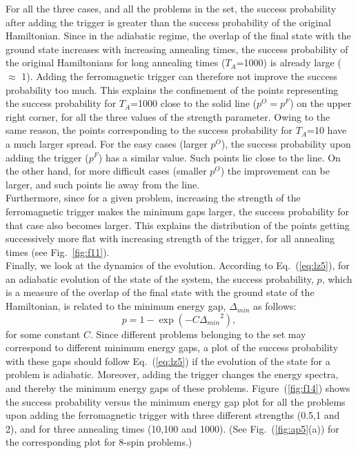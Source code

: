 \documentclass[../main.tex]{subfiles}
\begin{document}
For all the three cases, and all the problems in the set, the success probability after adding the trigger is greater than the success probability of the original Hamiltonian. Since in the adiabatic regime, the overlap of the final state with the ground state increases with increasing annealing times, the success probability of the original Hamiltonians for long annealing times ($T_A$=1000) is already large ($\approx$ 1). Adding the ferromagnetic trigger can therefore not improve the success probability too much. This explains the confinement of the points representing the success probability for $T_A$=1000 close to the solid line ($p^O=p^F$) on the upper right corner, for all the three values of the strength parameter. Owing to the same reason, the points corresponding to the success probability for $T_A$=10 have a much larger spread. For the easy cases (larger $p^O$), the success probability upon adding the trigger ($p^F$) has a similar value. Such points lie close to the line. On the other hand, for more difficult cases (smaller $p^O$) the improvement can be larger, and such points lie away from the line.\\

Furthermore, since for a given problem, increasing the strength of the ferromagnetic trigger makes the minimum gaps larger, the success probability for that case also becomes larger. This explains the distribution of the points getting successively more flat with increasing strength of the trigger, for all annealing times (see Fig.~\ref{fig:f11}).\\

Finally, we look at the dynamics of the evolution. According to Eq.~(\ref{eq:lz5}), for an adiabatic evolution of the state of the system, the success probability, $p$, which is a measure of the overlap of the final state with the ground state of the Hamiltonian, is related to the minimum energy gap, $\Delta_{min}$ as follows:
\begin{equation}
p=1-\exp(-C{\Delta_{min}}^2),
\end{equation}
for some constant $C$. Since different problems belonging to the set may correspond to different minimum energy gaps, a plot of the success probability with these gaps should follow Eq.~(\ref{eq:lz5}) if the evolution of the state for a problem is adiabatic. Moreover, adding the trigger changes the energy spectra, and thereby the minimum energy gaps of these problems. Figure~(\ref{fig:f14}) shows the success probability versus the minimum energy gap plot for all the problems upon adding the ferromagnetic trigger with three different strengths (0.5,1 and 2), and for three annealing times (10,100 and 1000). (See Fig.~(\ref{fig:ap5}(a)) for the corresponding plot for 8-spin problems.)
\end{document}
